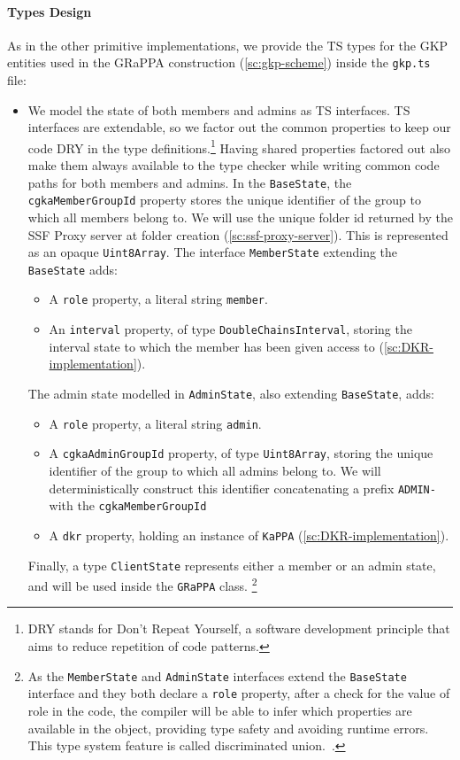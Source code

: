 \paragraph{Types Design}
As in the other primitive implementations,
we provide the TS types for the GKP entities used 
in the GRaPPA construction (\cref{sc:gkp-scheme}) inside the \texttt{gkp.ts} file:
\begin{itemize}
    \item We model the state of both members and admins as TS interfaces. 
    TS interfaces are extendable, so we factor out the common
    properties to keep our code DRY in the type definitions.\footnote{DRY stands for Don't Repeat Yourself, a software development principle that aims to reduce repetition of code patterns.}
    Having shared properties factored out also make them always
    available to the type checker while writing common code paths for both members and admins.
    In the \texttt{BaseState}, the \texttt{cgkaMemberGroupId} property stores the unique identifier of the group to which all members belong to. We will use the unique folder id returned by the SSF Proxy server at folder creation (\cref{sc:ssf-proxy-server}). This is represented as an opaque \texttt{Uint8Array}. 
    The interface \texttt{MemberState} extending the \texttt{BaseState} adds:
    \begin{itemize}
        \item A \texttt{role} property, a literal string \texttt{member}.
        \item An \texttt{interval} property, of type \texttt{DoubleChainsInterval}, storing the interval state to which the member has been given access to (\cref{sc:DKR-implementation}).
    \end{itemize}
    The admin state modelled in \texttt{AdminState}, also extending \texttt{BaseState}, adds:
    \begin{itemize}
        \item A \texttt{role} property, a literal string \texttt{admin}.
        \item A \texttt{cgkaAdminGroupId} property, of type \texttt{Uint8Array}, storing the unique identifier of the group to which all admins belong to. We will deterministically construct this identifier concatenating a prefix \texttt{ADMIN-} with the \texttt{cgkaMemberGroupId} 
        \item A \texttt{dkr} property, holding an instance of \texttt{KaPPA} (\cref{sc:DKR-implementation}).
    \end{itemize}
    Finally, a type \texttt{ClientState} represents either a member or an admin state, and will be used
    inside the \texttt{GRaPPA} class.
    \footnote{As the \texttt{MemberState} and \texttt{AdminState} interfaces 
    extend the \texttt{BaseState} interface and they both declare 
    a \texttt{role} property, after a check for the value of role in the code,
    the compiler will be able to infer which properties are available in the object, 
    providing type safety and avoiding runtime errors. This type system feature is called discriminated union.~\cite{TSDisciminatedUnions}.}
    

\end{itemize}
